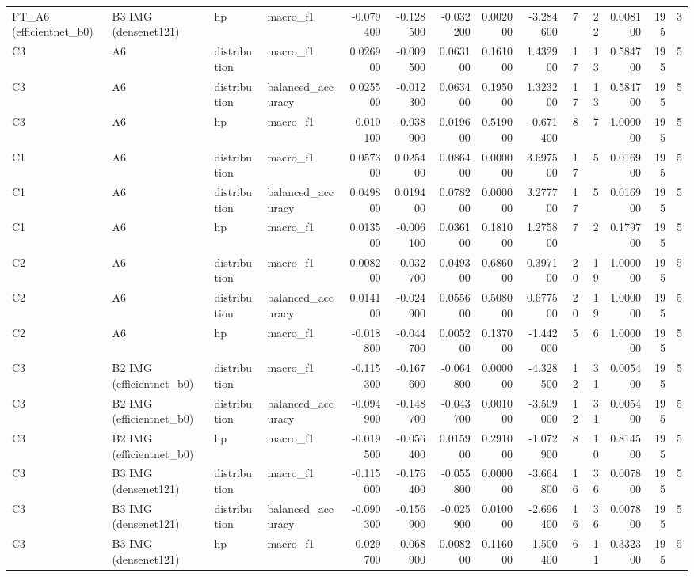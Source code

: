 \begin{table}
\begin{tabular}{llllrrrrrrrrrr}
FT\_A6 (efficientnet\_b0) & B3 IMG (densenet121) & hp & macro\_f1 & -0.079400 & -0.128500 & -0.032200 & 0.002000 & -3.284600 & 7 & 22 & 0.008100 & 195 & 3 \\
C3 & A6 & distribution & macro\_f1 & 0.026900 & -0.009500 & 0.063100 & 0.161000 & 1.432900 & 17 & 13 & 0.584700 & 195 & 5 \\
C3 & A6 & distribution & balanced\_accuracy & 0.025500 & -0.012300 & 0.063400 & 0.195000 & 1.323200 & 17 & 13 & 0.584700 & 195 & 5 \\
C3 & A6 & hp & macro\_f1 & -0.010100 & -0.038900 & 0.019600 & 0.519000 & -0.671400 & 8 & 7 & 1.000000 & 195 & 5 \\
C1 & A6 & distribution & macro\_f1 & 0.057300 & 0.025400 & 0.086400 & 0.000000 & 3.697500 & 17 & 5 & 0.016900 & 195 & 5 \\
C1 & A6 & distribution & balanced\_accuracy & 0.049800 & 0.019400 & 0.078200 & 0.000000 & 3.277700 & 17 & 5 & 0.016900 & 195 & 5 \\
C1 & A6 & hp & macro\_f1 & 0.013500 & -0.006100 & 0.036100 & 0.181000 & 1.275800 & 7 & 2 & 0.179700 & 195 & 5 \\
C2 & A6 & distribution & macro\_f1 & 0.008200 & -0.032700 & 0.049300 & 0.686000 & 0.397100 & 20 & 19 & 1.000000 & 195 & 5 \\
C2 & A6 & distribution & balanced\_accuracy & 0.014100 & -0.024900 & 0.055600 & 0.508000 & 0.677500 & 20 & 19 & 1.000000 & 195 & 5 \\
C2 & A6 & hp & macro\_f1 & -0.018800 & -0.044700 & 0.005200 & 0.137000 & -1.442000 & 5 & 6 & 1.000000 & 195 & 5 \\
C3 & B2 IMG (efficientnet\_b0) & distribution & macro\_f1 & -0.115300 & -0.167600 & -0.064800 & 0.000000 & -4.328500 & 12 & 31 & 0.005400 & 195 & 5 \\
C3 & B2 IMG (efficientnet\_b0) & distribution & balanced\_accuracy & -0.094900 & -0.148700 & -0.043700 & 0.001000 & -3.509000 & 12 & 31 & 0.005400 & 195 & 5 \\
C3 & B2 IMG (efficientnet\_b0) & hp & macro\_f1 & -0.019500 & -0.056400 & 0.015900 & 0.291000 & -1.072900 & 8 & 10 & 0.814500 & 195 & 5 \\
C3 & B3 IMG (densenet121) & distribution & macro\_f1 & -0.115000 & -0.176400 & -0.055800 & 0.000000 & -3.664800 & 16 & 36 & 0.007800 & 195 & 5 \\
C3 & B3 IMG (densenet121) & distribution & balanced\_accuracy & -0.090300 & -0.156900 & -0.025900 & 0.010000 & -2.696400 & 16 & 36 & 0.007800 & 195 & 5 \\
C3 & B3 IMG (densenet121) & hp & macro\_f1 & -0.029700 & -0.068900 & 0.008200 & 0.116000 & -1.500400 & 6 & 11 & 0.332300 & 195 & 5 \\
\bottomrule
\end{tabular}
\end{table}
